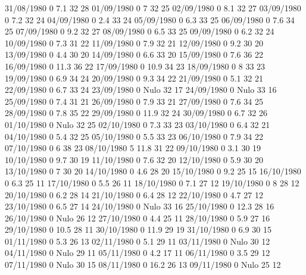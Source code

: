 31/08/1980  0      7.1    32     28 
01/09/1980  0      7      32     25 
02/09/1980  0      8.1    32     27 
03/09/1980  0      7.2    32     24 
04/09/1980  0      2.4    33     24 
05/09/1980  0      6.3    33     25 
06/09/1980  0      7.6    34     25 
07/09/1980  0      9.2    32     27 
08/09/1980  0      6.5    33     25 
09/09/1980  0      6.2    32     24 
10/09/1980  0      7.3    31     22 
11/09/1980  0      7.9    32     21 
12/09/1980  0      9.2    30     20 
13/09/1980  0      4.4    30     20 
14/09/1980  0      6.6    33     20 
15/09/1980  0      7.6    36     22 
16/09/1980  0      11.3   36     22 
17/09/1980  0      10.9   34     23 
18/09/1980  0      8      33     23 
19/09/1980  0      6.9    34     24 
20/09/1980  0      9.3    34     22 
21/09/1980  0      5.1    32     21 
22/09/1980  0      6.7    33     24 
23/09/1980  0     Nulo    32     17 
24/09/1980  0     Nulo    33     16 
25/09/1980  0      7.4    31     21 
26/09/1980  0      7.9    33     21 
27/09/1980  0      7.6    34     25 
28/09/1980  0      7.8    35     22 
29/09/1980  0      11.9   32     24 
30/09/1980  0      6.7    32     26 
01/10/1980  0     Nulo    32     25 
02/10/1980  0      7.3    33     23 
03/10/1980  0      6.4    32     21 
04/10/1980  0      5.4    32     25 
05/10/1980  0      5.5    33     23 
06/10/1980  0      7.9    34     22 
07/10/1980  0      6      38     23 
08/10/1980  5      11.8   31     22 
09/10/1980  0      3.1    30     19 
10/10/1980  0      9.7    30     19 
11/10/1980  0      7.6    32     20 
12/10/1980  0      5.9    30     20 
13/10/1980  0      7      30     20 
14/10/1980  0      4.6    28     20 
15/10/1980  0      9.2    25     15 
16/10/1980  0      6.3    25     11 
17/10/1980  0      5.5    26     11 
18/10/1980  0      7.1    27     12 
19/10/1980  0      8      28     12 
20/10/1980  0      6.2    28     14 
21/10/1980  0      6.4    28     12 
22/10/1980  0      4.7    27     12 
23/10/1980  0      6.5    27     14 
24/10/1980  0     Nulo    33     16 
25/10/1980  0      12.3   28     16 
26/10/1980  0     Nulo    26     12 
27/10/1980  0      4.4    25     11 
28/10/1980  0      5.9    27     16 
29/10/1980  0      10.5   28     11 
30/10/1980  0      11.9   29     19 
31/10/1980  0      6.9    30     15 
01/11/1980  0      5.3    26     13 
02/11/1980  0      5.1    29     11 
03/11/1980  0     Nulo    30     12 
04/11/1980  0     Nulo    29     11 
05/11/1980  0      4.2    17     11 
06/11/1980  0      3.5    29     12 
07/11/1980  0     Nulo    30     15 
08/11/1980  0      16.2   26     13 
09/11/1980  0     Nulo    25     12 
